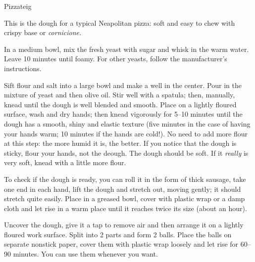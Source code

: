 \begin{recipe}[\vegan]{Pizzateig}

    \begin{ingredients}
    \end{ingredients}

    \begin{instructions}
        This is the dough for a typical Neapolitan pizza: soft and easy to chew with crispy base or \emph{cornicione.}

        In a medium bowl, mix the fresh yeast with sugar and whisk in the warm water.
        Leave 10 minutes until foamy.
        For other yeasts, follow the manufacturer's instructions.

        Sift flour and salt into a large bowl and make a well in the center.
        Pour in the mixture of yeast and then olive oil.
        Stir well with a spatula; then, manually, knead until the dough is well blended and smooth.
        Place on a lightly floured surface, wash and dry hands; then knead vigorously for 5--10 minutes until the dough has a smooth, shiny and elastic texture (five minutes in the case of having your hands warm; 10 minutes if the hands are cold!).
        No need to add more flour at this step: the more humid it is, the better.
        If you notice that the dough is sticky, flour your hands, not the deough.
        The dough should be soft.
        If it \emph{really} is very soft, knead with a little more flour.

        To check if the dough is ready, you can roll it in the form of thick sausage, take one end in each hand, lift the dough and stretch out, moving gently; it should stretch quite easily.
        Place in a greased bowl, cover with plastic wrap or a damp cloth and let rise in a warm place until it reaches twice its size (about an hour).

        Uncover the dough, give it a tap to remove air and then arrange it on a lightly floured work surface.
        Split into 2 parts and form 2 balls.
        Place the balls on separate nonstick paper, cover them with plastic wrap loosely and let rise for 60--90 minutes.
        You can use them whenever you want.
    \end{instructions}
\end{recipe}
